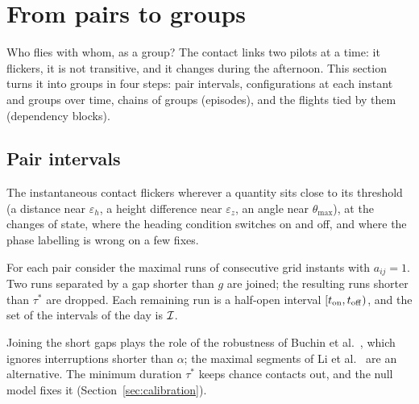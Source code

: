 \section{From pairs to groups}\label{sec:groups}

Who flies with whom, as a group? The contact links two pilots at a time: it flickers, it is not
transitive, and it changes during the afternoon. This section turns it into groups in four steps:
pair intervals, configurations at each instant and groups over time, chains of groups
(episodes), and the flights tied by them (dependency blocks).

\subsection{Pair intervals}\label{sec:pair-intervals}

The instantaneous contact flickers wherever a quantity sits close to its threshold (a distance
near $\varepsilon_h$, a height difference near $\varepsilon_z$, an angle near $\theta_{\max}$), at
the changes of state, where the heading condition switches on and off, and where the phase
labelling is wrong on a few fixes.

\begin{definition}\label{def:pair-interval}
For each pair consider the maximal runs of consecutive grid instants with $a_{ij}=1$. Two runs
separated by a gap shorter than $g$ are joined; the resulting runs shorter than $\tau^*$ are
dropped. Each remaining run is a half-open interval $[t_{\rm on}, t_{\rm off})$, and the set of
the intervals of the day is $\mathcal{I}$.
\end{definition}

Joining the short gaps plays the role of the robustness of Buchin et al.~\cite[§4]{buchin2015},
which ignores interruptions shorter than $\alpha$; the maximal segments of Li et
al.~\cite{li2013,ruzzo1999} are an alternative. The minimum duration $\tau^*$ keeps chance
contacts out, and the null model fixes it (Section~\ref{sec:calibration}).

